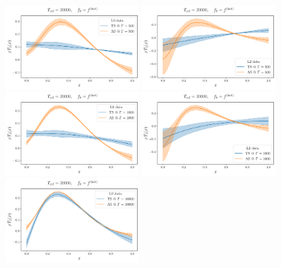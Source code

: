   \begin{figure}[ht!]
    \centering
    \includegraphics[width=0.45\textwidth]{plots/analytical_solution/xT3/evolution/tr_vs_an/L0/linear/evolution_vs_trained_epoch_500_L0_linear.pdf}
    \hspace{10mm}
    \includegraphics[width=0.45\textwidth]{plots/analytical_solution/xT3/evolution/tr_vs_an/L2/linear/evolution_vs_trained_epoch_500_L2_linear.pdf}
    \includegraphics[width=0.45\textwidth]{plots/analytical_solution/xT3/evolution/tr_vs_an/L0/linear/evolution_vs_trained_epoch_1000_L0_linear.pdf}
    \hspace{10mm}
    \includegraphics[width=0.45\textwidth]{plots/analytical_solution/xT3/evolution/tr_vs_an/L2/linear/evolution_vs_trained_epoch_1000_L2_linear.pdf}
    \includegraphics[width=0.45\textwidth]{plots/analytical_solution/xT3/evolution/tr_vs_an/L0/linear/evolution_vs_trained_epoch_10000_L0_linear.pdf}

\end{figure}
